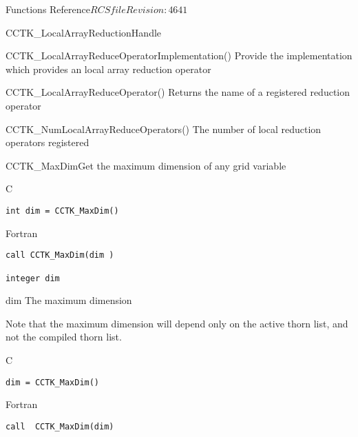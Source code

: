 \begin{cactuspart}{ Functions Reference}{$RCSfile$}{$Revision: 4641 $}
\begin{FunctionDescription}{CCTK\_LocalArrayReductionHandle}
\begin{SeeAlsoSection}
\begin{SeeAlso}{CCTK\_LocalArrayReduceOperatorImplementation()}
Provide the implementation which provides an local array reduction operator
\end{SeeAlso}

\begin{SeeAlso}{CCTK\_LocalArrayReduceOperator()}
Returns the name of a registered reduction operator
\end{SeeAlso}

\begin{SeeAlso}{CCTK\_NumLocalArrayReduceOperators()}
The number of local reduction operators registered
\end{SeeAlso}
\end{SeeAlsoSection}
\end{FunctionDescription}



\begin{FunctionDescription}{CCTK\_MaxDim}{Get the maximum dimension of any grid variable }
\label{CCTK-MaxDim}
\begin{SynopsisSection}
\begin{Synopsis}{C}
\begin{verbatim}int dim = CCTK_MaxDim()\end{verbatim}
\end{Synopsis}
\begin{Synopsis}{Fortran}
\begin{verbatim}call CCTK_MaxDim(dim )

integer dim\end{verbatim}
\end{Synopsis}
\end{SynopsisSection}
\begin{ParameterSection}
\begin{Parameter}{dim}
The maximum dimension
\end{Parameter}
\end{ParameterSection}
\begin{Discussion}
Note that the maximum dimension will depend only on the active thorn list,
and not the compiled thorn list.
\end{Discussion}
\begin{ExampleSection}
\begin{Example}{C}
\begin{verbatim}
dim = CCTK_MaxDim()
\end{verbatim}
\end{Example}
\begin{Example}{Fortran}
\begin{verbatim}
call  CCTK_MaxDim(dim)
\end{verbatim}
\end{Example}
\end{ExampleSection}
\end{FunctionDescription}



\end{cactuspart}
